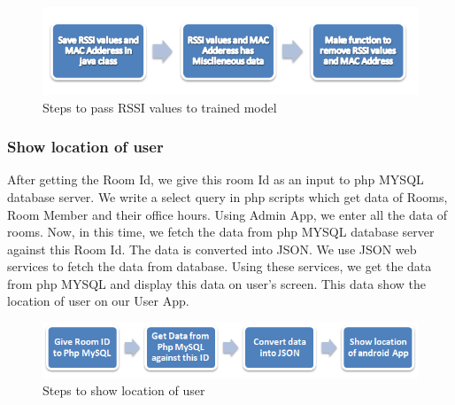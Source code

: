 \begin{figure}[h]
  		\centering
    		\includegraphics[scale=0.8]{./Figures/d4}
\caption{Steps to pass RSSI values to trained model}
\label{fig:20}
 		\end{figure}


\subsubsection{Show location of user}

After getting the Room Id, we give this room Id as an input to php MYSQL database server. We write a select query in php scripts which get data of Rooms, Room Member and their office hours.
 Using Admin App, we enter all the data of rooms. Now, in this time, we fetch the data from php MYSQL database server against this Room Id. The data is converted into JSON. We use JSON web services to fetch the data from database. Using these services, we get the data from php MYSQL and display this data on user’s screen. This data show the location of user on our User App.
\begin{figure}[h]
  		\centering
    		\includegraphics[scale=0.8]{./Figures/d5}
\caption{Steps to show location of user}
\label{fig:21}
 		\end{figure}

